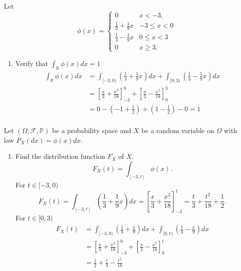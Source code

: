 \begin{exercise}[]
    \label{ex:12.3}
    Let
    \[
    \phi(x) = \begin{cases}
        0 & x<-3, \\
        \frac{1}{3} + \frac{1}{9}x & -3 \le x < 0 \\
        \frac{1}{3} - \frac{1}{9}x & 0 \le x < 3 \\
        0 & x\ge 3.
    \end{cases}
    \] 
    \begin{enumerate}[label=(\alph*)]
        \item Verify that $\int_{\mathbb{R}} \phi(x)dx = 1$
            \begin{align*}
                \int_{\mathbb{R}} \phi(x)dx 
                &=\int_{[-3,0)} \left( \frac{1}{3}+\frac{1}{9}x\right)dx +\int_{[0,3)} \left( \frac{1}{3} - \frac{1}{9}x \right)dx \\ 
                &= \left[\frac{x}{3} + \frac{x^{2}}{18}\right]_{-3}^{0} + \left[\frac{x}{3} - \frac{x^{2}}{18}\right]_{0}^{3} \\
                &= 0 - \left( -1 + \frac{1}{2} \right) + \left( 1-\frac{1}{2} \right)  - 0 = 1\\            
            \end{align*}
    \end{enumerate}
    Let $(\Omega, \mathcal{F}, \mathbb{P})$ be a probability space and $X$ be a random variable on $\Omega$ with law 
    $P_X(dx) = \phi(x)dx$.
    \begin{enumerate}[label=(\alph*), start=2]
        \item Find the distribution function $F_X$ of $X$.
            \[
            F_X(t) = \int_{[-3, t]} \phi(x) 
            .\] 
            For $t \in [-3, 0)$ 
            \[
            F_X(t)= \int_{[-3, t]} \left( \frac{1}{3} + \frac{1}{9}x \right)dx 
            = \left[ \frac{x}{3} + \frac{x^{2}}{18} \right]_{-3}^{t} 
            = \frac{t}{3} + \frac{t^2}{18} +\frac{1}{2} 
            .\] 
            For $t \in [0, 3) $ 
            \begin{align*}
                F_X(t) &= \int_{[-3, 0)}\left( \frac{1}{3} + \frac{x}{9} \right) dx 
                + \int_{[0, t)} \left( \frac{1}{3} - \frac{x}{9} \right) dx\\
                &= \left[ \frac{x}{3} + \frac{x^2}{18} \right]_{-3}^{0} 
                + \left[ \frac{x}{3} - \frac{x^2}{18} \right]_{0}^{t}\\
                &= \frac{1}{2} + \frac{t}{3} - \frac{t^2}{18} \\

\end{align*}
\end{enumerate}
\end{exercise}
